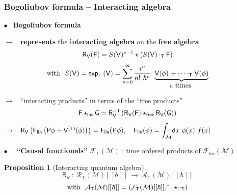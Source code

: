\documentclass[9pt]{beamer}
\renewcommand{\exp}{\mathsf{exp}}
\newcommand{\loc}{\mathsf{loc}}
\newcommand{\Acal}{\mathcal{A}}
\newcommand{\Fcal}{\mathcal{F}}
\newcommand{\Mcal}{\mathcal{M}}
\newcommand{\Rcal}{\mathcal{R}}
\newcommand{\Fsf}{\mathsf{F}}
\newcommand{\Gsf}{\mathsf{G}}
\newcommand{\Psf}{\mathsf{P}}
\newcommand{\Rsf}{\mathsf{R}}
\newcommand{\Tsf}{\mathsf{T}}
\newcommand{\Vsf}{\mathsf{V}}
\newcommand{\dsf}{\mathsf{d}}
\newtheorem{proposition}{Proposition}
\begin{document}
\begin{frame}

\frametitle{Bogoliubov formula -- Interacting algebra}

$\bullet$ \ \textbf{Bogoliubov formula}\par
%
$\to$ \ \textbf{represents} the \textbf{interacting algebra} on the \textbf{free algebra}
%
\vspace*{-8pt}
\begin{equation*}
\Rsf_\Vsf(\Fsf) = S(\Vsf)^{\star-1} \star \left( S(\Vsf) \cdot_\Tsf \Fsf \right)
\vspace*{-8pt}
\end{equation*}
%
\begin{equation*}
\mbox{with} \ \ S(\Vsf) = \exp_\Tsf\left(\Vsf\right) = \sum^\infty_{n=0} \frac{i^n}{n!\ \hbar^n} \ \underbrace{\Vsf(\phi) \cdot_\Tsf \cdots \cdot_\Tsf \Vsf(\phi)}_{n \mbox{ times }} 
\vspace*{-2pt}
\end{equation*}

$\to$ \ ``interacting products'' in terms of the ``free products''
%
\vspace*{-7pt}
\begin{equation*}
\Fsf \star_{\mathsf{int}} \Gsf = \Rsf_\Vsf^{-1}\left( \Rsf_\Vsf(\Fsf) \star_{\mathsf{free}} \Rsf_\Vsf(\Gsf)\right)
\vspace*{-7pt}
\end{equation*}
%
$\to$ \  $\Rsf_\Vsf\left(\Fsf_\mathsf{lin}\left(\Psf\phi + \Vsf^{(1)}(\phi)\right)\right) = \Fsf_\mathsf{lin}(\Psf\phi) , \ \ \ \Fsf_\mathsf{lin}(\phi) = \mathlarger{\int_{\Mcal}} \dsf x \ \phi(x) \ f(x)$

\vfill
\vspace*{4pt}

$\bullet$ \ \textdbend \ \textbf{``Causal functionals''} $\Fcal_\Tsf(\Mcal)$ : time ordered products of $\Fcal_\loc(\Mcal)$ \\

\vfill

\begin{proposition}[Interacting quantum algebra]
%
\vspace*{-20pt}
\begin{equation*}
\Rsf_\Vsf \ : \ \Rcal_\Tsf(\Mcal)[[\hbar]] \ \to \ \Acal_\Tsf(\Mcal)[[\hbar]]
\end{equation*}
%
\vspace*{-20pt}
\begin{equation*}
\mbox{with} \ \ \Acal_\Tsf(\Mcal)[[\hbar]] = \left(\Fcal_\Tsf(\Mcal)[[\hbar]] , ^\ast , \star . \cdot_\Tsf \right) 
\vspace*{-6pt}
\end{equation*}
%
\end{proposition}

\end{frame}
\end{document}
